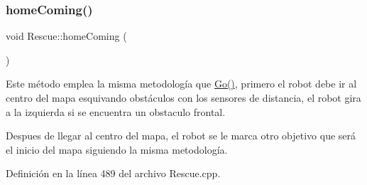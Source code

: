 \subsubsection{\texorpdfstring{home\+Coming()}{homeComing()}}
{\footnotesize\ttfamily void Rescue\+::home\+Coming (\begin{DoxyParamCaption}{ }\end{DoxyParamCaption})}



Este método emplea la misma metodología que \hyperlink{classRescue_acfe79ba42004fd73e17e240c0201462a_acfe79ba42004fd73e17e240c0201462a}{Go()}, primero el robot debe ir al centro del mapa esquivando obstáculos con los sensores de distancia, el robot gira a la izquierda si se encuentra un obstaculo frontal. 

Despues de llegar al centro del mapa, el robot se le marca otro objetivo que será el inicio del mapa siguiendo la misma metodología. 

Definición en la línea 489 del archivo Rescue.\+cpp.


